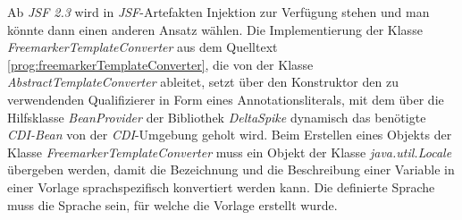 \newline
\newline
Ab \emph{JSF 2.3} wird in \emph{JSF}-Artefakten Injektion zur Verfügung stehen und man könnte dann einen anderen Ansatz wählen. Die Implementierung der Klasse \emph{FreemarkerTemplateConverter} aus dem Quelltext \ref{prog:freemarkerTemplateConverter}, die von der Klasse \emph{AbstractTemplateConverter} ableitet, setzt über den Konstruktor den zu verwendenden Qualifizierer in Form eines Annotationsliterals, mit dem über die Hilfsklasse \emph{BeanProvider} der Bibliothek \emph{DeltaSpike} dynamisch das benötigte \emph{CDI-Bean} von der \emph{CDI}-Umgebung geholt wird. Beim Erstellen eines Objekts der Klasse \emph{FreemarkerTemplateConverter} muss ein Objekt der Klasse \emph{java.util.Locale} übergeben werden, damit die Bezeichnung und die Beschreibung einer Variable in einer Vorlage sprachspezifisch konvertiert werden kann. Die definierte Sprache muss die Sprache sein, für welche die Vorlage erstellt wurde.
\newpage

